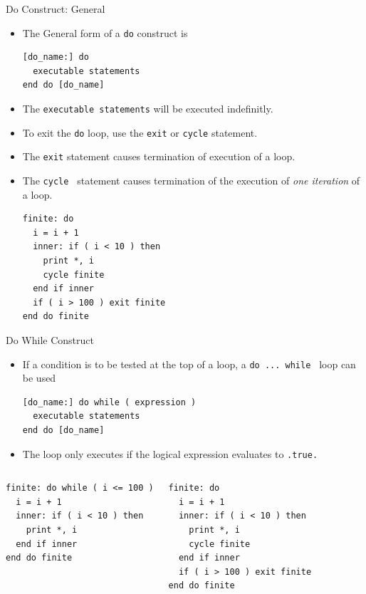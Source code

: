 \documentclass[c,mathserif,compress,xcolor=svgnames]{beamer}
\newcommand{\lstfortran}[1]{\lstinline[language={[90]Fortran},basicstyle=\footnotesize\ttfamily]|#1|}
\begin{document}
\begin{frame}[fragile]{Do Construct: General}
  \begin{itemize}
    \item The General form of a \lstfortran{do} construct is
      \begin{lstlisting}[language={[90]Fortran},basicstyle=\fontsize{6}{7}\selectfont\ttfamily]
[do_name:] do
  executable statements
end do [do_name]
      \end{lstlisting}
    \item The \lstfortran{executable statements} will be executed indefinitly.
    \item To exit the \lstfortran{do} loop, use the \lstfortran{exit} or \lstfortran{cycle} statement.
    \item The \lstfortran{exit} statement causes termination of execution of a loop.
    \item The \lstfortran{cycle } statement causes termination of the execution of \textit{one iteration} of a loop.
      \begin{lstlisting}[language={[90]Fortran},basicstyle=\fontsize{6}{7}\selectfont\ttfamily]
finite: do
  i = i + 1
  inner: if ( i < 10 ) then
    print *, i
    cycle finite
  end if inner
  if ( i > 100 ) exit finite
end do finite
      \end{lstlisting}
  \end{itemize}
\end{frame}


\begin{frame}[fragile]{Do While Construct}
  \begin{itemize}
    \item If a condition is to be tested at the top of a loop, a \lstfortran{do ... while } loop can be used
      \begin{lstlisting}[language={[90]Fortran},basicstyle=\fontsize{6}{7}\selectfont\ttfamily]
[do_name:] do while ( expression )
  executable statements
end do [do_name]
      \end{lstlisting}
    \item The loop only executes if the logical expression evaluates to \lstfortran{.true.}
  \end{itemize}
  \begin{columns}[t]
    \begin{lstlisting}[language={[90]Fortran},basicstyle=\fontsize{6}{7}\selectfont\ttfamily]
finite: do while ( i <= 100 )
  i = i + 1
  inner: if ( i < 10 ) then
    print *, i
  end if inner
end do finite
    \end{lstlisting}
    \begin{lstlisting}[language={[90]Fortran},basicstyle=\fontsize{6}{7}\selectfont\ttfamily]
finite: do
  i = i + 1
  inner: if ( i < 10 ) then
    print *, i
    cycle finite
  end if inner
  if ( i > 100 ) exit finite
end do finite
    \end{lstlisting}
  \end{columns}
\end{frame}
\end{document}
